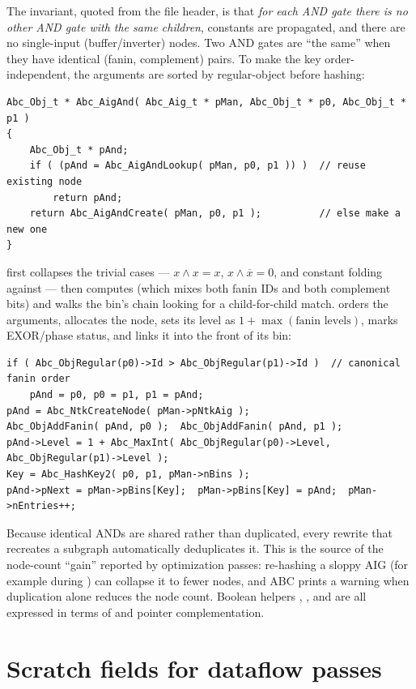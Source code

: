 The invariant, quoted from the file header, is that \emph{for each AND gate
there is no other AND gate with the same children}, constants are propagated,
and there are no single-input (buffer/inverter) nodes. Two AND gates are
``the same'' when they have identical (fanin, complement) pairs. To make the key
order-independent, the arguments are sorted by regular-object  before
hashing:

\begin{lstlisting}[style=abccode]
Abc_Obj_t * Abc_AigAnd( Abc_Aig_t * pMan, Abc_Obj_t * p0, Abc_Obj_t * p1 )
{
    Abc_Obj_t * pAnd;
    if ( (pAnd = Abc_AigAndLookup( pMan, p0, p1 )) )  // reuse existing node
        return pAnd;
    return Abc_AigAndCreate( pMan, p0, p1 );          // else make a new one
}
\end{lstlisting}

 first collapses the trivial cases --- $x\wedge x = x$,
$x\wedge\overline{x}=0$, and constant folding against  --- then
computes  (which mixes both fanin IDs and both complement
bits) and walks the bin's  chain looking for a child-for-child match.
 orders the arguments, allocates the node, sets its level
as $1+\max(\text{fanin levels})$, marks EXOR/phase status, and links it into the
front of its bin:

\begin{lstlisting}[style=abccode]
if ( Abc_ObjRegular(p0)->Id > Abc_ObjRegular(p1)->Id )  // canonical fanin order
    pAnd = p0, p0 = p1, p1 = pAnd;
pAnd = Abc_NtkCreateNode( pMan->pNtkAig );
Abc_ObjAddFanin( pAnd, p0 );  Abc_ObjAddFanin( pAnd, p1 );
pAnd->Level = 1 + Abc_MaxInt( Abc_ObjRegular(p0)->Level, Abc_ObjRegular(p1)->Level );
Key = Abc_HashKey2( p0, p1, pMan->nBins );
pAnd->pNext = pMan->pBins[Key];  pMan->pBins[Key] = pAnd;  pMan->nEntries++;
\end{lstlisting}

Because identical ANDs are shared rather than duplicated, every rewrite that
recreates a subgraph automatically deduplicates it. This is the source of the
node-count ``gain'' reported by optimization passes: re-hashing a sloppy AIG (for
example during ) can collapse it to fewer nodes, and ABC prints a
warning when duplication alone reduces the node count. Boolean helpers
, , and  are all expressed in
terms of  and pointer complementation.

\section{Scratch fields for dataflow passes}

